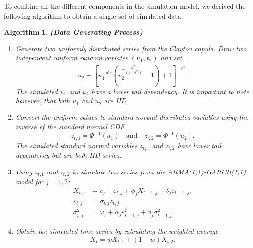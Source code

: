 \documentclass[a4paper,12pt]{article}
\theoremstyle{plain}
\begin{document}
To combine all the different components in the simulation model, we derived the following algorithm to obtain a single set of simulated data.

\newtheorem{myalgo}{Algorithm}
\begin{myalgo}{\textbf{(Data Generating Process)}}
    \quad
    \begin{enumerate}
        \item Generate two uniformly distributed series from the Clayton copula. Draw two independent uniform random variates $\left(u_{1},v_{2}\right)$ and set
            \begin{equation}                u_{2}=\left[u_{1}^{-\theta^{Cl}}\left(v_{2}^{-\frac{\theta^{Cl}}{\left(1+\theta^{Cl}\right)}}-1\right)+1\right]^{-\frac{1}{\theta^{Cl}}}.
            \end{equation}
        The simulated $u_1$ and $u_2$ have a lower tail dependency. It is important to note however, that both $u_1$ and $u_2$ are IID.
        \item Convert the uniform values to standard normal distributed variables using the inverse of the standard normal CDF
        \begin{equation}
            z_{t,1} = \Phi^{-1}(u_1) \quad \text{and} \quad z_{t,2} = \Phi^{-1}(u_2).
        \end{equation}
        The simulated standard normal variables $z_{t,1}$ and $z_{t,2}$ have lower tail dependency but are both IID series.
        \item Using $z_{t,1}$ and $z_{t,2}$ to simulate two series from the ARMA(1,1)-GARCH(1,1) model for $j=1,2$:
        \begin{equation}
            \begin{split}
                X_{t,j} &= c_{j} + \varepsilon_{t,j} + \phi_{j}X_{t-1,j} + \theta_{j}\varepsilon_{t-1,j},\\ \varepsilon_{t,j} &= \sigma_{t,j}z_{t,j}\\
                \sigma^2_{t,j} &= \omega_j + \alpha_{j}\varepsilon_{t-1,j}^2 + \beta_{j}\sigma_{t-1,j}^2.
            \end{split}
            \label{eq:simarmagarchdef}
        \end{equation}
        \item Obtain the simulated time series by calculating the weighted average
        \begin{equation}
            X_t = wX_{t,1} + \left(1-w\right)X_{t,2}.
        \end{equation}
    \end{enumerate}
\end{myalgo}
\end{document}
